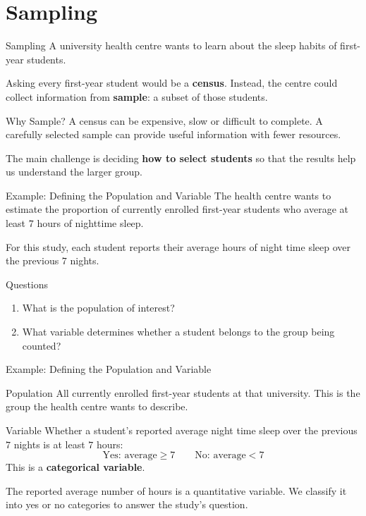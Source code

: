 \documentclass[aspectratio=169]{beamer}
\begin{document}
\section{Sampling}

\begin{frame}{Sampling}
A university health centre wants to learn about the sleep habits of first-year students.

Asking every first-year student would be a \textbf{census}. Instead, the centre could collect information from \textbf{sample}: a subset of those students.

\begin{block}{Why Sample?}
A census can be expensive, slow or difficult to complete. A carefully selected sample can provide useful information with fewer resources.
\end{block}

The main challenge is deciding \textbf{how to select students} so that the results help us understand the larger group.
\end{frame}

\begin{frame}{Example: Defining the Population and Variable}
The health centre wants to estimate the proportion of currently enrolled first-year students who average at least $7$ hours of nighttime sleep.

For this study, each student reports their average hours of night time sleep over the previous $7$ nights.

\begin{block}{Questions}
\begin{enumerate}
	\item What is the population of interest?
	\item What variable determines whether a student belongs to the group being counted?
\end{enumerate}
\end{block}
\end{frame}

\begin{frame}{Example: Defining the Population and Variable}
\begin{block}{Population}
All currently enrolled first-year students at that university. This is the group the health centre wants to describe.
\end{block}

\begin{block}{Variable}
Whether a student's reported average night time sleep over the previous $7$ nights is at least $7$ hours:
$$\text{Yes: average}\geq7 \qquad \text{No: average}<7$$
This is a \textbf{categorical variable}.
\end{block}

The reported average number of hours is a quantitative variable. We classify it into yes or no categories to answer the study's question.
\end{frame}
\end{document}
